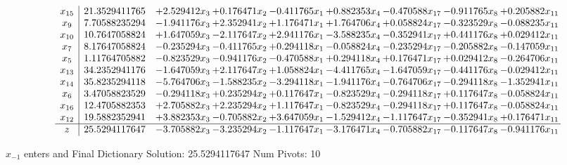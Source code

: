 \documentclass[10pt]{article}
\begin{document}
 \[\begin{array}{c| c c@{\hskip 2pt} c@{\hskip 2pt} c@{\hskip 2pt} c@{\hskip 2pt} c@{\hskip 2pt} c@{\hskip 2pt} c@{\hskip 2pt} }
 x_{15}   &  21.3529411765 & + 2.529412 x_{3} & + 0.176471 x_{2} & -0.411765 x_{1} & + 0.882353 x_{4} & -0.470588 x_{17} & -0.911765 x_{8} & + 0.205882 x_{11}\\
 x_{9}   &  7.70588235294 & -1.941176 x_{3} & + 2.352941 x_{2} & + 1.176471 x_{1} & + 1.764706 x_{4} & + 0.058824 x_{17} & -0.323529 x_{8} & -0.088235 x_{11}\\
 x_{10}   &  10.7647058824 & + 1.647059 x_{3} & -2.117647 x_{2} & + 2.941176 x_{1} & -3.588235 x_{4} & -0.352941 x_{17} & + 0.441176 x_{8} & + 0.029412 x_{11}\\
 x_{7}   &  8.17647058824 & -0.235294 x_{3} & -0.411765 x_{2} & + 0.294118 x_{1} & -0.058824 x_{4} & -0.235294 x_{17} & -0.205882 x_{8} & -0.147059 x_{11}\\
 x_{5}   &  1.11764705882 & -0.823529 x_{3} & -0.941176 x_{2} & -0.470588 x_{1} & + 0.294118 x_{4} & + 0.176471 x_{17} & + 0.029412 x_{8} & -0.264706 x_{11}\\
 x_{13}   &  34.2352941176 & -1.647059 x_{3} & + 2.117647 x_{2} & + 1.058824 x_{1} & -4.411765 x_{4} & -1.647059 x_{17} & -0.441176 x_{8} & -0.029412 x_{11}\\
 x_{14}   &  35.8235294118 & -5.764706 x_{3} & -1.588235 x_{2} & -3.294118 x_{1} & -1.941176 x_{4} & -0.764706 x_{17} & -0.294118 x_{8} & -1.352941 x_{11}\\
 x_{6}   &  3.47058823529 & -0.294118 x_{3} & + 0.235294 x_{2} & + 0.117647 x_{1} & -0.823529 x_{4} & -0.294118 x_{17} & + 0.117647 x_{8} & -0.058824 x_{11}\\
 x_{16}   &  12.4705882353 & + 2.705882 x_{3} & + 2.235294 x_{2} & + 1.117647 x_{1} & -0.823529 x_{4} & -0.294118 x_{17} & + 0.117647 x_{8} & -0.058824 x_{11}\\
 x_{12}   &  19.5882352941 & + 3.882353 x_{3} & -0.705882 x_{2} & + 3.647059 x_{1} & -1.529412 x_{4} & -1.117647 x_{17} & -0.352941 x_{8} & + 0.176471 x_{11}\\
\hline
z    &  25.5294117647 & -3.705882 x_{3} & -3.235294 x_{2} & -1.117647 x_{1} & -3.176471 x_{4} & -0.705882 x_{17} & -0.117647 x_{8} & -0.941176 x_{11}\\
\end{array}\]


 $ x_{-1} $ enters and Final Dictionary
Solution:  25.5294117647
Num Pivots:  10
\end{document}
